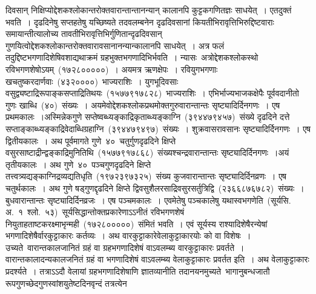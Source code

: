 \documentclass[11pt, openany]{book}
\begin{document}
\newpage
\thispagestyle{fancy}
\fancyhf{}
\noindent
दिवसान् निक्षिप्योद्देशकश्लोकान्तरोक्तवारान्तान्तानन्यान् कालानपि
कुट्टकगणितज्ञः साधयेत्~। एतदुक्तं भवति~। दृढदिनेषु सप्तहतेषु यच्छिष्यते तदवलम्बनेन दृढदिवसानां कियतीभिरावृत्तिभिरुद्दिष्टवाराः समायान्तीत्यालोच्य
तावतीभिरावृत्तिभिर्गुणितान्दृढदिवसान् गुणयित्वोद्देशकश्लोकान्तरोक्तवारावसानानन्यान्कालानपि साधयेत्~। 
अत्र फलं तदुद्दिष्टभगणादिशेषिवशाद्यथाक्रमं ग्रहभुक्तभगणादिभिर्भवति~।  न्यासः\textendash\ अत्रोद्देशकश्लोकस्थो रविभगणशेषोऽयम्~(१७२८०००००)~। अयमत्र ऋणक्षेपः~। रवियुगभगणाः खचतुष्करदार्णवाः~(४३२००००)~भाज्यराशिः~। युगभूदिवसाः वसुद्व्यष्टाद्रिरूपाङ्कसप्ताद्रितिथयः~(१५७७९१७८२८)~भाज्यराशिः~।  एभिर्भाज्यभाजकक्षेपैः पूर्ववदानीतो गुणः खाब्धि~(४०)~संख्यः~। अयमेवोद्देशकश्लोकप्रथमोक्तगुरुवारान्तान्तः सृष्ट्यादिर्दिनगणः~। एष प्रथमकालः~।अस्मिन्नेकगुणे सप्तेष्वब्ध्यङ्काद्रिकृताब्ध्यङ्काग्नि~(३९४४७९४५७)~संख्ये दृढदिने दत्ते सप्ताङ्काब्ध्यङ्काद्रिवेदाब्धिग्रहाग्नि~(३९४४७९४९७)~संख्यः~। शुक्रवासरावसानः सृष्ट्यादिर्दिनगणः~। एष द्वितीयकालः~। अथ पूर्वमागते गुणे~४०~चतुर्गुणदृढदिने क्षिप्ते वसुरसाष्टाद्रीन्द्वङ्काद्रिमुनितिथि~(१५७७९१७८६८)~संख्यश्चन्द्रवारान्तान्तः सृष्ट्यादिर्दिनगणः~।अयं तृतीयकालः~। अथ गुणे~४०~पञ्चगुणदृढदिने क्षिप्ते
तत्त्वत्र्यद्यङ्काग्निद्रव्यद्यतिधृति~(१९७२३९७३२५)~संख्य कुजवारान्तान्तः सृष्ट्यादिर्दिनव्रणः~। एष चतुर्थकालः~। अथ गुणे षड्गुणद्दृढदिने क्षिप्ते द्विवसुशैलरसाद्रिवसुरसर्तुत्रिद्वि~(२३६६८७६७८२)~संख्यः~। बुधवारान्तान्तः सृष्ट्यादिर्दिनव्रजः~। एष पञ्चमकालः~। एवमेतेषु पञ्चकालेषु यथास्वभगणेति~(सूर्यसि. अ.~१~श्लो.~५३)~सूर्यसिद्धान्तोक्तप्रकारेणाऽऽनीतं रविभगणशेषं नियुताहताष्टकरक्ष्माभृन्मही~(१७२८०००००)~संमितं भवति~। एवं सूर्यस्य राश्यादिशेषैरन्येषां भगणादिशेषैर्वारकुट्टाकारः कर्तव्यः~। अथ वारकुट्टाकारेवेलाकुट्टाकारयोः को वा विशेषः~। उच्यते\textendash\ वारान्तकालजानितं ग्रहं वा ग्रहभगणादिशेषं वाऽवलम्ब्य वारकुट्टाकारः प्रवर्तते~। वारान्तकालादन्यकालजनितं ग्रहं वा भगणादिशेषं वाऽवलम्ब्य वेलाकुट्टाकारः प्रवर्तत इति~। अथ वेलाकुट्टाकारः प्रदर्श्यते~। तत्राऽऽदौ वेलायां ग्रहभगणादिशेषाणि ज्ञातव्यानीति तदानयनमुच्यते\textendash\ भागानुबन्धजातौ रूपगुणच्छेदगुणस्वांशयुतेष्टदिनवृन्दं तत्रत्येन
\end{document}
